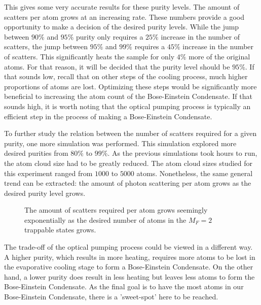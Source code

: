 This gives some very accurate results for these purity levels. The amount of scatters per atom grows at an increasing rate. These numbers provide a good opportunity to make a decision of the desired purity levels. While the jump between $90\%$ and $95\%$ purity only requires a $25\%$ increase in the number of scatters, the jump between $95\%$ and $99\%$ requires a $45\%$ increase in the number of scatters. This significantly heats the sample for only $4\%$ more of the original atoms. For that reason, it will be decided that the purity level should be $95\%$. If that sounds low, recall that on other steps of the cooling process, much higher proportions of atoms are lost. Optimizing these steps would be significantly more beneficial to increasing the atom count of the Bose-Einstein Condensate. If that sounds high, it is worth noting that the optical pumping process is typically an efficient step in the process of making a Bose-Einstein Condensate. 

To further study the relation between the number of scatters required for a given purity, one more simulation was performed. This simulation explored more desired purities from $80\%$ to $99\%$. As the previous simulations took hours to run, the atom cloud size had to be greatly reduced. The atom cloud sizes studied for this experiment ranged from $1000$ to $5000$ atoms. Nonetheless, the same general trend can be extracted: the amount of photon scattering per atom grows as the desired purity level grows. 

\begin{figure}[h!]
\begin{center}
\end{center}
\caption{The amount of scatters required per atom grows seemingly exponentially as the desired number of atoms in the $M_F=2$ trappable states grows. }
\end{figure}

The trade-off of the optical pumping process could be viewed in a different way. A higher purity, which results in more heating, requires more atoms to be lost in the evaporative cooling stage to form a Bose-Einstein Condensate. On the other hand, a lower purity does result in less heating but leaves less atoms to form the Bose-Einstein Condensate. As the final goal is to have the most atoms in our Bose-Einstein Condensate, there is a 'sweet-spot' here to be reached. 
\newline

